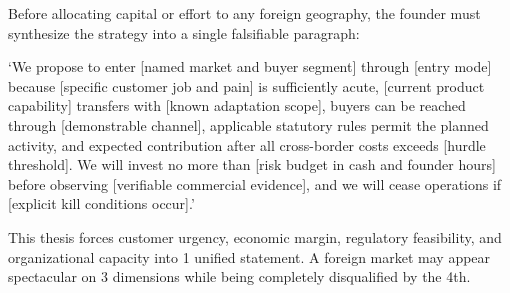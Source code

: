 Before allocating capital or effort to any foreign geography, the founder must synthesize the strategy into a single falsifiable paragraph:
\begin{tcolorbox}[colback=BayesCanvas,colframe=BayesTeal,arc=1mm,title=\textbf{The Canonical Internationalization Thesis}]
`We propose to enter [named market and buyer segment] through [entry mode] because [specific customer job and pain] is sufficiently acute, [current product capability] transfers with [known adaptation scope], buyers can be reached through [demonstrable channel], applicable statutory rules permit the planned activity, and expected contribution after all cross-border costs exceeds [hurdle threshold]. We will invest no more than [risk budget in cash and founder hours] before observing [verifiable commercial evidence], and we will cease operations if [explicit kill conditions occur].'
\end{tcolorbox}

This thesis forces customer urgency, economic margin, regulatory feasibility, and organizational capacity into 1 unified statement. A foreign market may appear spectacular on 3 dimensions while being completely disqualified by the 4th.

